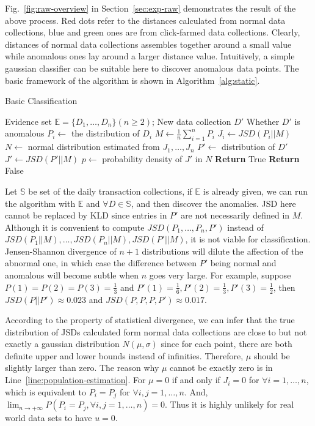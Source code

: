 \documentclass[10pt,conference,letterpaper]{IEEEtran}
\begin{document}
			Fig.~\ref{fig:raw-overview} in Section~\ref{sec:exp-raw} demonstrates the result of the above process. Red dots refer to the distances calculated from normal data collections, blue and green ones are from click-farmed data collections. Clearly, distances of normal data collections assembles together around a small value while anomalous ones lay around a larger distance value. Intuitively, a simple gaussian classifier can be suitable here to discover anomalous data points. The basic framework of the algorithm is shown in Algorithm~\ref{alg:static}.
	
			\begin{algorithm}[!t]
				\caption{Basic Classification}
				\label{alg:static}
				\begin{algorithmic}[1]
					\Require Evidence set $\mathbb{E} = \{D_1, \dots, D_n\}(n\ge2)$; New data collection $D'$
					\Ensure Whether $D'$ is anomalous
					\State $P_i \gets$ the distribution of $D_i$
					\EndFor
					\State $M \gets \frac{1}{n}\sum_{i=1}^{n}P_i$\label{line:population-estimation}
					\State $J_i \gets JSD(P_i||M)$
					\EndFor
					\State $N \gets$ normal distribution estimated from $J_1, \dots, J_n$
					\State $P' \gets$ distribution of $D'$
					\State $J' \gets JSD(P'||M)$
					\State $p \gets$ probability density of $J'$ in $N$
					\State \textbf{Return} True
					\Else
					\State \textbf{Return} False
					\EndIf
				\end{algorithmic}
			\end{algorithm}
	
			Let $\mathbb{S}$ be set of the daily transaction collections, if $\mathbb{E}$ is already given, we can run the algorithm with $\mathbb{E}$ and $\forall D \in \mathbb{S}$, and then discover the anomalies. JSD here cannot be replaced by KLD since entries in $P'$ are not necessarily defined in $M$. Although it is convenient to compute $JSD(P_1, \dots, P_n, P')$ instead of $JSD(P_1||M), \dots, JSD(P_n||M), JSD(P'||M)$, it is not viable for classification. Jensen-Shannon divergence of $n+1$ distributions will dilute the affection of the abnormal one, in which case the difference between $P'$ being normal and anomalous will become subtle when $n$ goes very large. For example, suppose $P(1) = P(2) = P(3) = \frac{1}{3}$ and $P'(1) = \frac{1}{6}, P'(2) = \frac{1}{3}, P'(3) = \frac{1}{2}$, then $JSD(P||P') \approx 0.023$ and $JSD(P, P, P, P') \approx 0.017$.
	
			According to the property of statistical divergence, we can infer that the true distribution of JSDs calculated form normal data collections are close to but not exactly a gaussian distribution $N(\mu, \sigma)$ since for each point, there are both definite upper and lower bounds instead of infinities. Therefore, $\mu$ should be slightly larger than zero. The reason why $\mu$ cannot be exactly zero is in Line~\ref{line:population-estimation}.
			For $\mu = 0$ if and only if $J_i = 0$ for $\forall i = 1, \dots, n$, which is equivalent to $P_i = P_j$ for $\forall i, j = 1, \dots, n$. And, $\lim_{n\rightarrow+\infty}P(P_i = P_j,\forall i, j = 1, \dots, n)=0$. Thus it is highly unlikely for real world data sets to have $u=0$.
	
\end{document}
